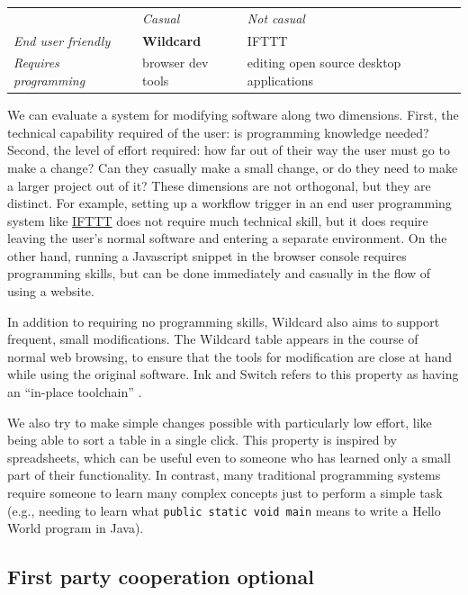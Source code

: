\documentclass[english,submission]{programming}
\begin{document}
\begin{longtable}[]{@{}lll@{}}
\toprule
\endhead
& \emph{Casual} & \emph{Not casual}\tabularnewline
\emph{End user friendly} & \textbf{Wildcard} & IFTTT\tabularnewline
\emph{Requires programming} & browser dev tools & editing open source
desktop applications\tabularnewline
\bottomrule
\end{longtable}

We can evaluate a system for modifying software along two dimensions.
First, the technical capability required of the user: is programming
knowledge needed? Second, the level of effort required: how far out of
their way the user must go to make a change? Can they casually make a
small change, or do they need to make a larger project out of it? These
dimensions are not orthogonal, but they are distinct. For example,
setting up a workflow trigger in an end user programming system like
\href{https://ifttt.com/}{IFTTT} does not require much technical skill,
but it does require leaving the user's normal software and entering a
separate environment. On the other hand, running a Javascript snippet in
the browser console requires programming skills, but can be done
immediately and casually in the flow of using a website.

In addition to requiring no programming skills, Wildcard also aims to
support frequent, small modifications. The Wildcard table appears in the
course of normal web browsing, to ensure that the tools for modification
are close at hand while using the original software. Ink and Switch
refers to this property as having an ``in-place toolchain''
\autocite{inkandswitch2019}.

We also try to make simple changes possible with particularly low
effort, like being able to sort a table in a single click. This property
is inspired by spreadsheets, which can be useful even to someone who has
learned only a small part of their functionality. In contrast, many
traditional programming systems require someone to learn many complex
concepts just to perform a simple task (e.g., needing to learn what
\texttt{public\ static\ void\ main} means to write a Hello World program
in Java).

\hypertarget{first-party-cooperation-optional}{%
\subsection{First party cooperation
optional}\label{first-party-cooperation-optional}}
\end{document}
